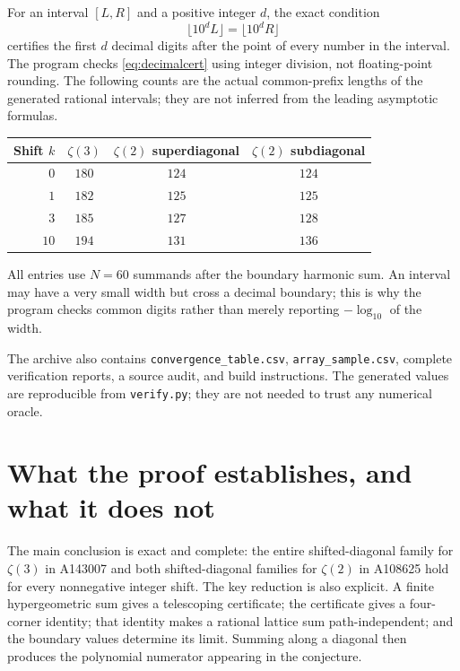 \documentclass[11pt]{article}
\numberwithin{equation}{section}
\theoremstyle{definition}
\theoremstyle{remark}
\begin{document}
For an interval $[L,R]$ and a positive integer $d$, the exact condition
\begin{equation}\label{eq:decimalcert}
 \lfloor10^dL\rfloor=\lfloor10^dR\rfloor
\end{equation}
certifies the first $d$ decimal digits after the point of every number
in the interval. The program checks \eqref{eq:decimalcert} using integer
division, not floating-point rounding. The following counts are the
actual common-prefix lengths of the generated rational intervals;
they are not inferred from the leading asymptotic formulas.

\begin{center}
\begin{tabular}{@{}rccc@{}}
\toprule
Shift $k$ & $\zeta(3)$ & $\zeta(2)$ superdiagonal & $\zeta(2)$ subdiagonal\\
\midrule
$0$  & $180$ & $124$ & $124$\\
$1$  & $182$ & $125$ & $125$\\
$3$  & $185$ & $127$ & $128$\\
$10$ & $194$ & $131$ & $136$\\
\bottomrule
\end{tabular}
\end{center}
\noindent All entries use $N=60$ summands after the boundary harmonic sum.
An interval may have a very small width but cross a decimal boundary;
this is why the program checks common digits rather than merely
reporting $-\log_{10}$ of the width.

The archive also contains \texttt{convergence\_table.csv},
\texttt{array\_sample.csv}, complete verification reports, a source audit,
and build instructions. The generated values are reproducible from
\texttt{verify.py}; they are not needed to trust any numerical oracle.

\section{What the proof establishes, and what it does not}\label{sec:scope}

The main conclusion is exact and complete: the entire shifted-diagonal
family for $\zeta(3)$ in A143007 and both shifted-diagonal families for
$\zeta(2)$ in A108625 hold for every nonnegative integer shift.
The key reduction is also explicit. A finite hypergeometric sum gives
a telescoping certificate; the certificate gives a four-corner identity;
that identity makes a rational lattice sum path-independent; and the
boundary values determine its limit. Summing along a diagonal then
produces the polynomial numerator appearing in the conjecture.
\end{document}
